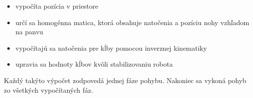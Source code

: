 \begin{itemize}
 \item vypočíta pozícia v priestore
 \item určí sa homogénna matica, ktorá obsahuje natočenia a pozíciu nohy vzhľadom na panvu
 \item vypočítajú sa natočenia pre kĺby pomocou inverznej kinematiky
 \item upravia sa hodnoty kĺbov kvôli stabilizovaniu robota
\end{itemize}
Každý takýto výpočet zodpovedá jednej fáze pohybu. Nakoniec sa vykoná pohyb zo všetkých vypočítaných fáz.